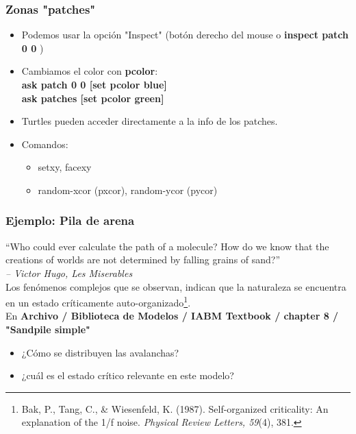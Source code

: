 \documentclass[11pt]{beamer}
\begin{document}
\begin{frame}
\frametitle{Zonas "patches"}
\begin{itemize}
	\item Podemos usar la opción "Inspect" (botón derecho del mouse o \textbf{inspect patch 0 0} )
	\item Cambiamos el color con \textbf{pcolor}:\\
	 \textbf{ask patch 0 0 [set pcolor blue]} \\
	 \textbf{ask patches [set pcolor green]}
	\item  Turtles pueden acceder directamente a la info de los patches.
	\item Comandos: 
	\begin{itemize}
		\item setxy, facexy
		\item random-xcor (pxcor), random-ycor (pycor)
	\end{itemize}
\end{itemize}
\end{frame}

\begin{frame}
\frametitle{Ejemplo: Pila de arena}
{\small ``Who could ever calculate the path of a molecule?
How do we know that the creations of worlds are not determined by falling grains of sand?'' \\ \textit{ -- Victor Hugo, Les Miserables}}
\vspace{0.6cm}\\
Los fenómenos complejos que se observan, indican que la naturaleza se encuentra en un estado críticamente auto-organizado\footnote{Bak, P., Tang, C., \& Wiesenfeld, K. (1987). Self-organized criticality: An explanation of the 1/f noise. \textit{Physical Review Letters, 59}(4), 381.}.
\vspace{0.6cm}\\

En \textbf{Archivo / Biblioteca de Modelos / IABM Textbook / chapter 8 / "Sandpile simple"}
\begin{itemize}
	\item ¿Cómo se distribuyen las avalanchas?
	\item ¿cuál es el estado crítico relevante en este modelo?
\end{itemize}
\end{frame}
\end{document}
